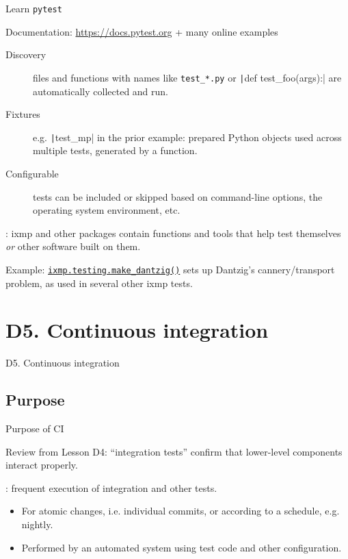 \documentclass[12pt,aspectratio=169]{beamer}
\begin{document}
\begin{frame}[fragile]{Learn \texttt{pytest}}

Documentation: \url{https://docs.pytest.org} + many online examples

\begin{description}
  \item [Discovery] files and functions with names like \texttt{test\_*.py} or \texttt|def test_foo(args):| are automatically collected and run.
  \item [Fixtures] e.g. \texttt|test_mp| in the prior example: prepared Python objects used across multiple tests, generated by a function.
  \item [Configurable] tests can be included or skipped based on command-line options, the operating system environment, etc.
\end{description}

\medskip
{}: ixmp and other packages contain functions and tools that help test themselves \emph{or} other software built on them.

\medskip
Example: \texttt{\href{https://docs.messageix.org/projects/ixmp/en/stable/api-python.html\#ixmp.testing.make_dantzig}{ixmp.testing.make\_dantzig()}} sets up Dantzig's cannery/transport problem, as used in several other ixmp tests.
\end{frame}


\section{D5. Continuous integration}
\begin{frame}{D5. Continuous integration}
\tableofcontents[hideothersubsections]
\end{frame}

\subsection{Purpose}
\begin{frame}{Purpose of CI} \large

Review from Lesson D4: “integration tests” confirm that lower-level components interact properly.

\bigskip
{}: frequent execution of integration and other tests.
\begin{itemize}
  \item For atomic changes, i.e. individual commits, or according to a schedule, e.g. nightly.
  \item Performed by an automated system using test code and other configuration.
\end{itemize}

\end{frame}
\end{document}

